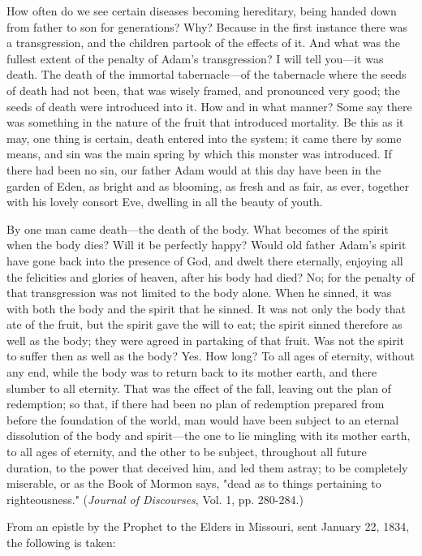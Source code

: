 How often do we see certain diseases becoming hereditary, being handed down from father
to son for generations? Why? Because in the first instance there was a transgression, and the
children partook of the effects of it. And what was the fullest extent of the penalty of Adam's
transgression? I will tell you—it was death. The death of the immortal tabernacle—of the
tabernacle where the seeds of death had not been, that was wisely framed, and pronounced
very good; the seeds of death were introduced into it. How and in what manner? Some say
there was something in the nature of the fruit that introduced mortality. Be this as it may, one
thing is certain, death entered into the system; it came there by some means, and sin was the
main spring by which this monster was introduced. If there had been no sin, our father Adam
would at this day have been in the garden of Eden, as bright and as blooming, as fresh and as
fair, as ever, together with his lovely consort Eve, dwelling in all the beauty of youth.

By one man came death—the death of the body. What becomes of the spirit when the body
dies? Will it be perfectly happy? Would old father Adam's spirit have gone back into the
presence of God, and dwelt there eternally, enjoying all the felicities and glories of heaven,
after his body had died? No; for the penalty of that transgression was not limited to the body
alone. When he sinned, it was with both the body and the spirit that he sinned. It was not only
the body that ate of the fruit, but the spirit gave the will to eat; the spirit sinned therefore as
well as the body; they were agreed in partaking of that fruit. Was not the spirit to suffer then
as well as the body? Yes. How long? To all ages of eternity, without any end, while the body
was to return back to its mother earth, and there slumber to all eternity. That was the effect of
the fall, leaving out the plan of redemption; so that, if there had been no plan of redemption
prepared from before the foundation of the world, man would have been subject to an eternal
dissolution of the body and spirit—the one to lie mingling with its mother earth, to all ages of
eternity, and the other to be subject, throughout all future duration, to the power that deceived
him, and led them astray; to be completely miserable, or as the Book of Mormon says, "dead
as to things pertaining to righteousness." (\textit{Journal of Discourses}, Vol. 1, pp. 280-284.)

From an epistle by the Prophet to the Elders in Missouri, sent January 22, 1834, the
following is taken:

